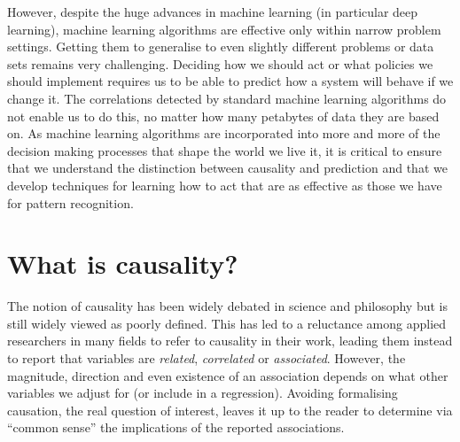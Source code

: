 \documentclass[11pt,a4paper,oneside]{book}
\newcommand{\quotes}[1]{``#1''}
\theoremstyle{plain}
\theoremstyle{definition}
\begin{document}
However, despite the huge advances in machine learning (in particular deep learning), machine learning algorithms are effective only within narrow problem settings. Getting them to generalise to even slightly different problems or data sets remains very challenging. Deciding how we should act or what policies we should implement requires us to be able to predict how a system will behave if we change it. The correlations detected by standard machine learning algorithms do not enable us to do this, no matter how many petabytes of data they are based on. As machine learning algorithms are incorporated into more and more of the decision making processes that shape the world we live it, it is critical to ensure that we understand the distinction between causality and prediction and that we develop techniques for learning how to act that are as effective as those we have for pattern recognition.


\section{What is causality? }

The notion of causality has been widely debated in science and philosophy \citep{hume1741treatise,mill1893system,pearson1911grammar,Pearl2000,Lewis2000,woodward2005making,heckman20051,cartwright2007hunting} but is still widely viewed as poorly defined. This has led to a reluctance among applied researchers in many fields to refer to causality in their work, leading them instead to report that variables are \textit{related}, \textit{correlated} or \textit{associated}. However, the magnitude, direction and even existence of an association depends on what other variables we adjust for (or include in a regression). Avoiding formalising causation, the real question of interest, leaves it up to the reader to determine via \quotes{common sense} the implications of the reported associations.
\end{document}
